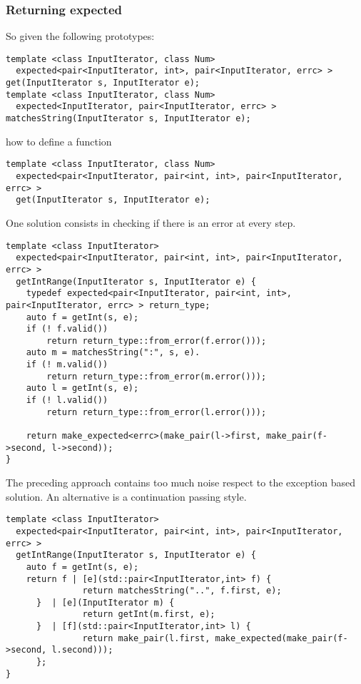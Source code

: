 \documentclass[a4paper,10pt]{article}
\begin{document}
\subsubsection{Returning expected}

So given the following prototypes:

\begin{lstlisting}
template <class InputIterator, class Num>
  expected<pair<InputIterator, int>, pair<InputIterator, errc> > get(InputIterator s, InputIterator e);
template <class InputIterator, class Num>
  expected<InputIterator, pair<InputIterator, errc> > matchesString(InputIterator s, InputIterator e);
\end{lstlisting}

\noindent
how to define a function

\begin{lstlisting}
template <class InputIterator, class Num>
  expected<pair<InputIterator, pair<int, int>, pair<InputIterator, errc> > 
  get(InputIterator s, InputIterator e);
\end{lstlisting}

One solution consists in checking if there is an error at every step. 

\begin{lstlisting}
template <class InputIterator>
  expected<pair<InputIterator, pair<int, int>, pair<InputIterator, errc> > 
  getIntRange(InputIterator s, InputIterator e) {
    typedef expected<pair<InputIterator, pair<int, int>, pair<InputIterator, errc> > return_type;
    auto f = getInt(s, e);
    if (! f.valid())  
        return return_type::from_error(f.error()));
    auto m = matchesString(":", s, e).
    if (! m.valid())  
        return return_type::from_error(m.error()));
    auto l = getInt(s, e);
    if (! l.valid())   
        return return_type::from_error(l.error()));
        
    return make_expected<errc>(make_pair(l->first, make_pair(f->second, l->second));
}
\end{lstlisting}

The preceding approach contains too much noise respect to the exception based solution. An alternative is a continuation passing style. 

\begin{lstlisting}
template <class InputIterator>
  expected<pair<InputIterator, pair<int, int>, pair<InputIterator, errc> > 
  getIntRange(InputIterator s, InputIterator e) {
    auto f = getInt(s, e);
    return f | [e](std::pair<InputIterator,int> f) {
    	       return matchesString("..", f.first, e); 
	  }  | [e](InputIterator m) {
               return getInt(m.first, e); 
	  }  | [f](std::pair<InputIterator,int> l) {
               return make_pair(l.first, make_expected(make_pair(f->second, l.second))); 
	  };
}
\end{lstlisting}
\end{document}
